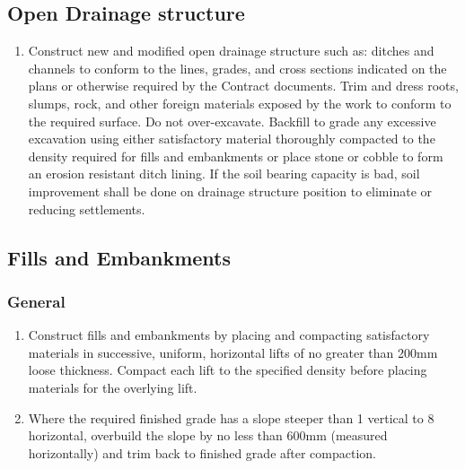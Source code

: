 \documentclass{article}%
\begin{document}
%
\subsection{Open Drainage structure}%
\label{subsec:OpenDrainagestructure}%
\begin{enumerate}[label=\alph*),start=1]%
\item%
Construct new and modified open drainage structure such as: ditches and channels to conform to the lines, grades, and cross sections indicated on the plans or otherwise required by the Contract documents. Trim and dress roots, slumps, rock, and other foreign materials exposed by the work to conform to the required surface. Do not over{-}excavate. Backfill to grade any excessive excavation using either satisfactory material thoroughly compacted to the density required for fills and embankments or place stone or cobble to form an erosion resistant ditch lining. If the soil bearing capacity is bad, soil improvement shall be done on drainage structure position to eliminate or reducing settlements.%
\end{enumerate}

%
\subsection{Fills and Embankments}%
\label{subsec:FillsandEmbankments}%
\subsubsection{General}%
\label{ssubsec:General}%
\begin{enumerate}[label=\alph*),start=1]%
\item%
Construct fills and embankments by placing and compacting satisfactory materials in successive, uniform, horizontal lifts of no greater than 200mm loose thickness. Compact each lift to the specified density before placing materials for the overlying lift. %
\item%
Where the required finished grade has a slope steeper than 1 vertical to 8 horizontal, overbuild the slope by no less than  600mm  (measured horizontally) and trim back to finished grade after compaction.%
\end{enumerate}

%
\end{document}
